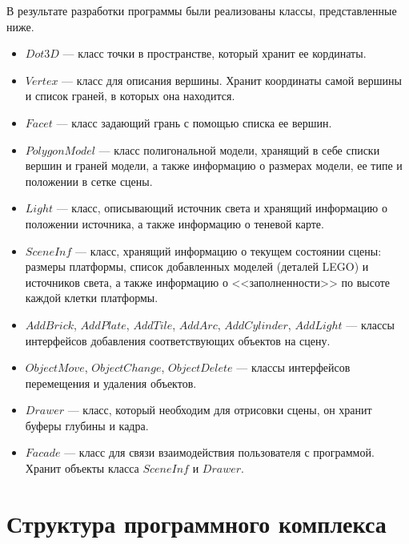 В результате разработки программы были реализованы классы, представленные ниже.
\begin{itemize}[label=---]
    \item $Dot3D$ --- класс точки в пространстве, который хранит ее кординаты.
    
    \item $Vertex$ --- класс для описания вершины. Хранит координаты самой вершины и список граней, в которых она находится.
    
    \item $Facet$ --- класс задающий грань с помощью списка ее вершин.
    
    \item $PolygonModel$ --- класс полигональной модели, хранящий в себе списки вершин и граней модели, а также информацию о размерах модели, ее типе и положении в сетке сцены.
    
    \item $Light$ --- класс, описывающий источник света и хранящий информацию о положении источника, а также информацию о теневой карте.
    
    \item $SceneInf$ --- класс, хранящий информацию о текущем состоянии сцены: размеры платформы, список добавленных моделей (деталей LEGO) и источников света, а также информацию о <<заполненности>> по высоте каждой клетки платформы.
    
    \item $AddBrick$, $AddPlate$, $AddTile$, $AddArc$, $AddCylinder$, $AddLight$ --- классы интерфейсов добавления соответствующих объектов на сцену.
    
    \item $ObjectMove$, $ObjectChange$, $ObjectDelete$ --- классы интерфейсов перемещения и удаления объектов.
    
    \item $Drawer$ --- класс, который необходим для отрисовки сцены, он хранит буферы глубины и кадра.

    \item $Facade$ --- класс для связи взаимодействия пользователя с программой. Хранит объекты класса $SceneInf$ и $Drawer$.
    
\end{itemize}

\section{Структура программного комплекса}

